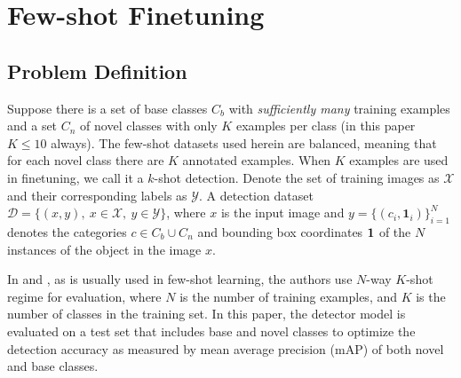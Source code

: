\documentclass{article}
\begin{document}
\section{Few-shot Finetuning}

\subsection{Problem Definition}
Suppose there is  a set of base classes $C_b$ with \textit{sufficiently many} training examples and a set $C_n$ 
of novel classes with only $K$ examples per class (in this paper $K \leq 10$ always). 
The few-shot datasets used herein are balanced, meaning that for each novel class there are $K$ annotated examples.
When $K$ examples are used in finetuning, we call it a $k$-shot detection. 
Denote the set of training images as $\mathcal{X}$ and their corresponding labels as $\mathcal{Y}$. 
A detection dataset $\mathcal{D} = \{ (x,y), ~ x \in \mathcal{X}, ~ y \in \mathcal{Y} \}$, where $x$ 
is the input image and $y= \{(c_i, \bm 1_i) \}_{i=1}^N$ denotes the categories $c \in  C_b \cup C_n$ and 
bounding box coordinates $\boldsymbol{1} $ of the $N$ instances of the object in the image $x$. 

In \cite{VinyalsBLKW16} and \cite{snell2017prototypical}, as is usually used in few-shot learning, 
the authors use $N$-way $K$-shot regime for evaluation, where $N$ is the number of training examples, 
and $K$ is the number of classes in the training set. 
In this paper, the detector model is evaluated on a test set that includes base and novel classes
to optimize the detection accuracy as measured by mean average precision (mAP) of both novel and base classes.
\end{document}
